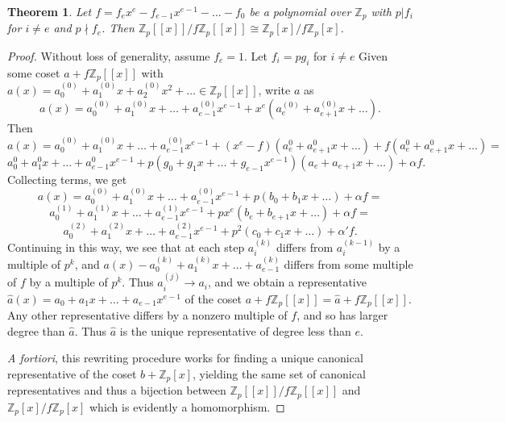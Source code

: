 \documentclass{article}
\newtheorem{theorem}{Theorem}
\newtheorem{comment}{Comment}
\begin{document}
\begin{comment}
This does not hold when the constant coefficient is merely a multiple of p.  The proof breaks down because the sets of canonical representatives in the two rings will not be the same.
\end{comment}


\begin{theorem} \label{iso2}
Let $f=f_ex^e - f_{e-1}x^{e-1} - \ldots - f_0$ be a polynomial over $\mathbb{Z}_p$ with $p | f_i$ for $i \ne e$ and $p \nmid f_e$.  Then $\mathbb{Z}_p[[x]]/f\mathbb{Z}_p[[x]] \cong \mathbb{Z}_p[x]/f\mathbb{Z}_p[x]$.
\end{theorem}
\begin{proof}
Without loss of generality, assume $f_e = 1$.  Let $f_i = pg_i$ for $i \ne e$ Given some coset $a + f\mathbb{Z}_p[[x]]$ with $a(x) = a_0^{(0)} + a_1^{(0)}x + a_2^{(0)}x^2 + \ldots \in \mathbb{Z}_p[[x]]$, write $a$ as $$a(x) = a_0^{(0)} + a_1^{(0)}x + \ldots + a_{e-1}^{(0)}x^{e-1} + x^e(a_e^{(0)} + a_{e+1}^{(0)}x + \ldots).$$  Then $$a(x) = a_0^{(0)} + a_1^{(0)}x + \ldots + a_{e-1}^{(0)}x^{e-1} + (x^e - f)(a_e^{0} + a_{e+1}^{0}x + \ldots) + f(a_e^{0} + a_{e+1}^{0}x + \ldots) = $$
$$a_0^{0} + a_1^{0}x + \ldots + a_{e-1}^{0}x^{e-1} + p(g_0 + g_1x + \ldots + g_{e-1}x^{e-1})(a_e + a_{e+1}x + \ldots) + \alpha f.$$  Collecting terms, we get $$a(x) = a_0^{(0)} + a_1^{(0)}x + \ldots + a_{e-1}^{(0)}x^{e-1} + p(b_0 + b_1x + \ldots) + \alpha f = $$
$$a_0^{(1)} + a_1^{(1)}x + \ldots + a_{e-1}^{(1)}x^{e-1} + px^e(b_e + b_{e+1}x + \dots) + \alpha f =$$
$$a_0^{(2)} + a_1^{(2)}x + \ldots + a_{e-1}^{(2)}x^{e-1} + p^2(c_0 + c_1x + \ldots) + \alpha'f.$$  Continuing in this way, we see that at each step $a_i^{(k)}$ differs from $a_i^{(k-1)}$ by a multiple of $p^k$, and $a(x) - a_0^{(k)} + a_1^{(k)}x + \ldots + a_{e-1}^{(k)}$ differs from some multiple of $f$ by a multiple of $p^k$.  Thus $a_i^{(j)} \to a_i$, and we obtain a representative $\hat{a}(x) = a_0 + a_1x + \ldots + a_{e-1}x^{e-1}$ of the coset $a + f\mathbb{Z}_p[[x]] = \hat{a} + f\mathbb{Z}_p[[x]]$.  Any other representative differs by a nonzero multiple of $f$, and so has larger degree than $\hat{a}$.  Thus $\hat{a}$ is the unique representative of degree less than $e$.


\textit{A fortiori}, this rewriting procedure works for finding a unique canonical representative of the coset $b + \mathbb{Z}_p[x]$, yielding the same set of canonical representatives and thus a bijection between $\mathbb{Z}_p[[x]]/f\mathbb{Z}_p[[x]]$ and $\mathbb{Z}_p[x]/f\mathbb{Z}_p[x]$ which is evidently a homomorphism.
\end{proof}
\end{document}
